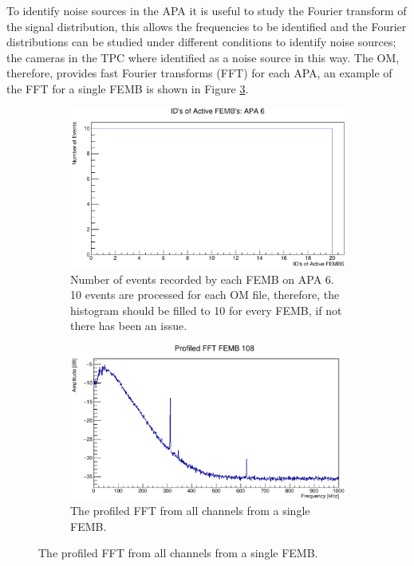 To identify noise sources in the APA it is useful to study the Fourier transform
of the signal distribution, this allows the frequencies to be identified and the
Fourier distributions can be studied under different conditions to identify
noise sources; the cameras in the TPC where identified as a noise source in
this way. The OM, therefore, provides fast Fourier transforms (FFT) for each
APA, an example of the FFT for a single FEMB is shown in Figure
\ref{fig:TPC_FFT}.

\begin{figure}

	\centering

	\begin{subfigure}[b]{0.75\textwidth}
		\centering
		\includegraphics[width=\textwidth]{figures/active_femb.pdf}
		\caption {Number of events recorded by each FEMB on APA 6. 10 events are
		processed for each OM file, therefore, the histogram should be filled to 10
		for every FEMB, if not there has been an issue.}
		\label{fig:active_femb}
	\end{subfigure}

	\begin{subfigure}[b]{0.75\textwidth}
		\centering
		\vspace{3mm}
		\includegraphics[width=\textwidth]{figures/tpc_fft.pdf}
		\caption {The profiled FFT from all channels from a single FEMB.}
		\label{fig:TPC_FFT}
	\end{subfigure}


\end{figure}
